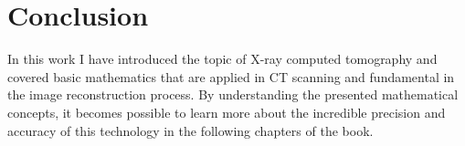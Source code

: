 \documentclass{article}
\begin{document}
		\section{Conclusion}
		In this work I have introduced the topic of X-ray
computed tomography and covered basic mathematics that are applied in CT scanning and fundamental in the image reconstruction process.
By understanding the presented mathematical concepts, it becomes possible to learn more about the incredible precision and accuracy of this technology in the following chapters of the book. 


		
		
\end{document}
